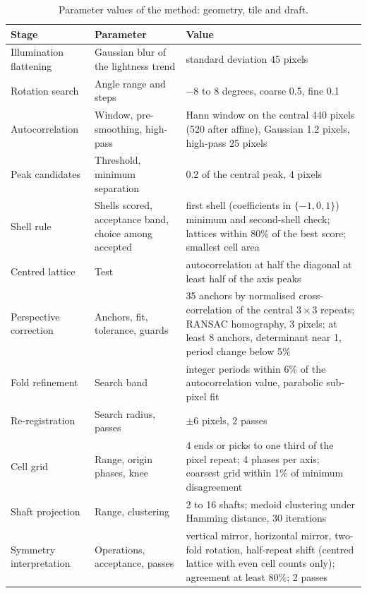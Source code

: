 \documentclass[12pt]{article}
\begin{document}
\begin{table}[htbp]
\caption{Parameter values of the method: geometry, tile and draft.}
\label{tab:params}
\footnotesize
\begin{tabular}{L{4.0cm}L{5.4cm}L{5.2cm}}
Stage & Parameter & Value \\ \midrule
Illumination flattening & Gaussian blur of the lightness trend & standard deviation 45 pixels \\
Rotation search & Angle range and steps & $-8$ to $8$ degrees, coarse 0.5, fine 0.1 \\
Autocorrelation & Window, pre-smoothing, high-pass & Hann window on the central 440 pixels (520 after affine), Gaussian 1.2 pixels, high-pass 25 pixels \\
Peak candidates & Threshold, minimum separation & 0.2 of the central peak, 4 pixels \\
Shell rule & Shells scored, acceptance band, choice among accepted & first shell (coefficients in $\{-1,0,1\}$) minimum and second-shell check; lattices within 80\% of the best score; smallest cell area \\
Centred lattice & Test & autocorrelation at half the diagonal at least half of the axis peaks \\
Perspective correction & Anchors, fit, tolerance, guards & 35 anchors by normalised cross-correlation of the central $3\times3$ repeats; RANSAC homography, 3 pixels; at least 8 anchors, determinant near 1, period change below 5\% \\
Fold refinement & Search band & integer periods within 6\% of the autocorrelation value, parabolic sub-pixel fit \\
Re-registration & Search radius, passes & $\pm 6$ pixels, 2 passes \\
Cell grid & Range, origin phases, knee & 4 ends or picks to one third of the pixel repeat; 4 phases per axis; coarsest grid within 1\% of minimum disagreement \\
Shaft projection & Range, clustering & 2 to 16 shafts; medoid clustering under Hamming distance, 30 iterations \\
Symmetry interpretation & Operations, acceptance, passes & vertical mirror, horizontal mirror, two-fold rotation, half-repeat shift (centred lattice with even cell counts only); agreement at least 80\%; 2 passes \\
\end{tabular}
\end{table}
\end{document}
